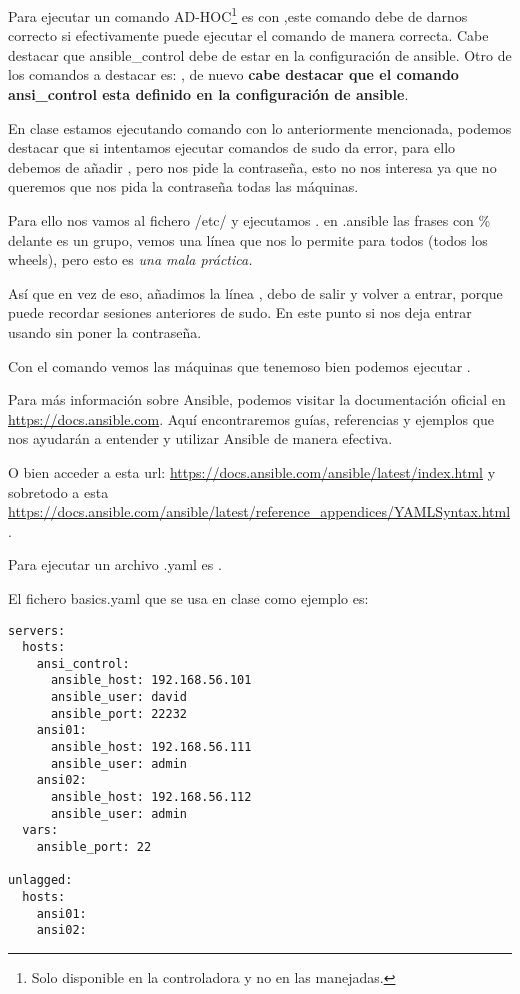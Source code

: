 Para ejecutar un comando AD-HOC\footnote{Solo disponible en la controladora y no en las manejadas.} es con ,este comando debe de darnos correcto si efectivamente puede ejecutar el comando de manera correcta. Cabe destacar que ansible\_control debe de estar en la configuración de ansible.
Otro de los comandos a destacar es: , de nuevo \textbf{cabe destacar que el comando ansi\_control esta definido en la configuración de ansible}.

En clase estamos ejecutando comando con lo anteriormente mencionada, podemos destacar que si intentamos ejecutar comandos de sudo da error, para ello debemos de añadir , pero nos pide la contraseña, esto no nos interesa ya que no queremos que nos pida la contraseña todas las máquinas.

Para ello nos vamos al fichero /etc/ y ejecutamos . en .ansible las frases con \% delante es un grupo, vemos una línea que nos lo permite para todos (todos los wheels), pero esto es \textit{una mala práctica.}

Así que en vez de eso, añadimos la línea , debo de salir y volver a entrar, porque puede recordar sesiones anteriores de sudo. En este punto si nos deja entrar usando  sin poner la contraseña.

Con el comando  vemos las máquinas que tenemoso bien podemos ejecutar .

Para más información sobre Ansible, podemos visitar la documentación oficial en \url{https://docs.ansible.com}. Aquí encontraremos guías, referencias y ejemplos que nos ayudarán a entender y utilizar Ansible de manera efectiva.

O bien acceder a esta url: \url{https://docs.ansible.com/ansible/latest/index.html} y sobretodo a esta \url{https://docs.ansible.com/ansible/latest/reference_appendices/YAMLSyntax.html}.

Para ejecutar un archivo .yaml es .

El fichero basics.yaml que se usa en clase como ejemplo es:
\begin{lstlisting}[style=yamlstyle]
servers:
  hosts:
    ansi_control:
      ansible_host: 192.168.56.101
      ansible_user: david
      ansible_port: 22232
    ansi01:
      ansible_host: 192.168.56.111
      ansible_user: admin
    ansi02:
      ansible_host: 192.168.56.112
      ansible_user: admin
  vars:
    ansible_port: 22

unlagged:
  hosts:
    ansi01:
    ansi02:
\end{lstlisting}

